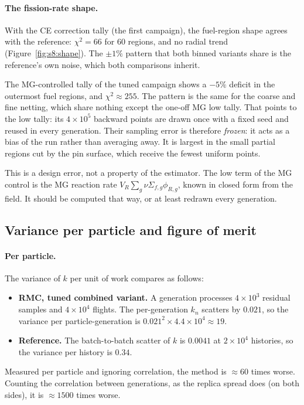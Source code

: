 \paragraph{The fission-rate shape.} With the CE correction tally (the first campaign), the fuel-region
shape agrees with the reference: $\chi^2=66$ for 60 regions, and no radial trend
(Figure~\ref{fig:s8:shape}). The $\pm1\%$ pattern that both binned variants share is the reference's
own noise, which both comparisons inherit.

The MG-controlled tally of the tuned campaign shows a $-5\%$ deficit in the outermost fuel regions,
and $\chi^2\approx255$. The pattern is the same for the coarse and fine netting, which share nothing
except the one-off MG low tally. That points to the low tally: its $4\times10^5$ backward points are
drawn once with a fixed seed and reused in every generation. Their sampling error is therefore
\emph{frozen}: it acts as a bias of the run rather than averaging away. It is largest in the small
partial regions cut by the pin surface, which receive the fewest uniform points.

This is a design error, not a property of the estimator. The low term of the MG control is the MG
reaction rate $V_R\sum_g\nu\Sigma_{f,g}\phi_{R,g}$, known in closed form from the field. It should be
computed that way, or at least redrawn every generation.

\subsection{Variance per particle and figure of merit}

\paragraph{Per particle.} The variance of $k$ per unit of work compares as follows:
\begin{itemize}
\item \textbf{RMC, tuned combined variant.} A generation processes $4\times10^3$ residual samples
  and $4\times10^4$ flights. The per-generation $k_n$ scatters by $0.021$, so the variance per
  particle-generation is $0.021^2\times4.4\times10^4\approx19$.
\item \textbf{Reference.} The batch-to-batch scatter of $k$ is $0.0041$ at $2\times10^4$ histories, so
  the variance per history is $0.34$.
\end{itemize}
Measured per particle and ignoring correlation, the method is $\approx60$ times worse. Counting the
correlation between generations, as the replica spread does (on both sides), it is $\approx1500$
times worse.

